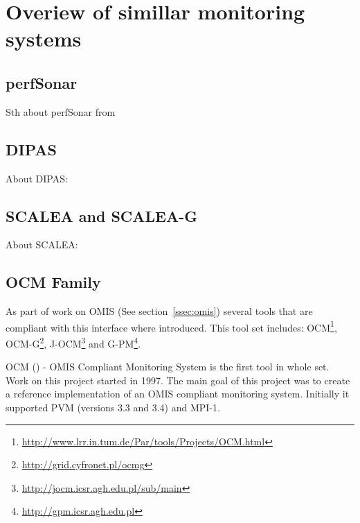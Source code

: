 %
 
 
\section{Overiew of simillar monitoring systems}
\label{sec:ch2_similar}


\subsection{perfSonar}

Sth about perfSonar from\cite{perfSonar1,perfSonar2,perfSonar3}


\subsection{DIPAS}

About DIPAS: \cite{DIPAS}

\subsection{SCALEA and SCALEA-G}

About SCALEA: \cite{SCALEA1,SCALEA2, SCALEA3}

\subsection{OCM Family}

As part of work on OMIS (See section~\ref{ssec:omis}) several tools that are compliant with this interface where introduced. This tool set includes: OCM\footnote{\url{http://www.lrr.in.tum.de/Par/tools/Projects/OCM.html}}, OCM-G\footnote{\url{http://grid.cyfronet.pl/ocmg}}, J-OCM\footnote{\url{http://jocm.icsr.agh.edu.pl/sub/main}} and G-PM\footnote{\url{http://gpm.icsr.agh.edu.pl}}.

OCM (\cite{RWspdt98, RW:ppam99b}) - OMIS Compliant Monitoring System is the first tool in whole set. Work on this project started in 1997. The main goal of this project was to create a reference implementation of an OMIS compliant monitoring system. Initially it supported PVM (versions 3.3 and 3.4) and MPI-1. 

